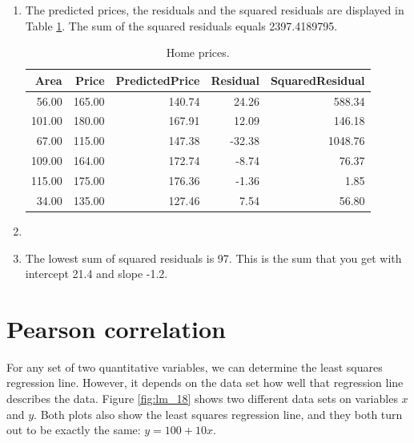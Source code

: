 \documentclass[]{book}\usepackage[]{graphicx}\usepackage[]{color}
\begin{document}
\begin{enumerate}

\item The predicted prices, the residuals and the squared residuals are displayed in Table \ref{tab:lm_17}. The sum of the squared residuals equals 2397.4189795.

\begin{table}[ht]
\centering
\caption{Home prices.} 
\label{tab:lm_17}
\begin{tabular}{rrrrr}
  \hline
Area & Price & PredictedPrice & Residual & SquaredResidual \\ 
  \hline
56.00 & 165.00 & 140.74 & 24.26 & 588.34 \\ 
  101.00 & 180.00 & 167.91 & 12.09 & 146.18 \\ 
  67.00 & 115.00 & 147.38 & -32.38 & 1048.76 \\ 
  109.00 & 164.00 & 172.74 & -8.74 & 76.37 \\ 
  115.00 & 175.00 & 176.36 & -1.36 & 1.85 \\ 
  34.00 & 135.00 & 127.46 & 7.54 & 56.80 \\ 
   \hline
\end{tabular}
\end{table}

\item

\item The lowest sum of squared residuals is 97. This is the sum that you get with intercept 21.4 and slope -1.2.

\end{enumerate}







\section{Pearson correlation}

For any set of two quantitative variables, we can determine the least squares regression line. However, it depends on the data set how well that regression line describes the data. Figure \ref{fig:lm_18} shows two different data sets on variables $x$ and $y$. Both plots also show the least squares regression line, and they both turn out to be exactly the same: $y=100+10x$.
\end{document}
